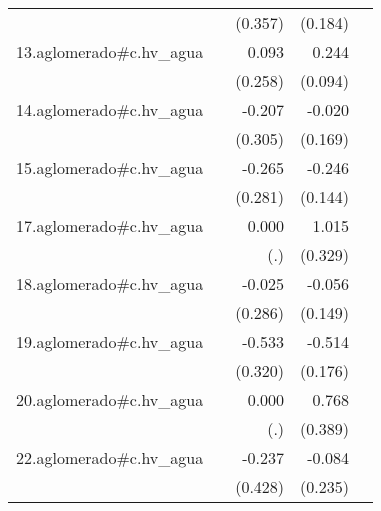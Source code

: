 {\begin{longtable}{l*{4}{D{.}{.}{-1}}}
            &                     &     (0.357)         &     (0.184)         &                     \\
\addlinespace
13.aglomerado#c.hv\_agua&                     &       0.093         &       0.244\sym{**} &                     \\
            &                     &     (0.258)         &     (0.094)         &                     \\
\addlinespace
14.aglomerado#c.hv\_agua&                     &      -0.207         &      -0.020         &                     \\
            &                     &     (0.305)         &     (0.169)         &                     \\
\addlinespace
15.aglomerado#c.hv\_agua&                     &      -0.265         &      -0.246         &                     \\
            &                     &     (0.281)         &     (0.144)         &                     \\
\addlinespace
17.aglomerado#c.hv\_agua&                     &       0.000         &       1.015\sym{**} &                     \\
            &                     &         (.)         &     (0.329)         &                     \\
\addlinespace
18.aglomerado#c.hv\_agua&                     &      -0.025         &      -0.056         &                     \\
            &                     &     (0.286)         &     (0.149)         &                     \\
\addlinespace
19.aglomerado#c.hv\_agua&                     &      -0.533         &      -0.514\sym{**} &                     \\
            &                     &     (0.320)         &     (0.176)         &                     \\
\addlinespace
20.aglomerado#c.hv\_agua&                     &       0.000         &       0.768\sym{*}  &                     \\
            &                     &         (.)         &     (0.389)         &                     \\
\addlinespace
22.aglomerado#c.hv\_agua&                     &      -0.237         &      -0.084         &                     \\
            &                     &     (0.428)         &     (0.235)         &                     \\

\end{longtable}}
